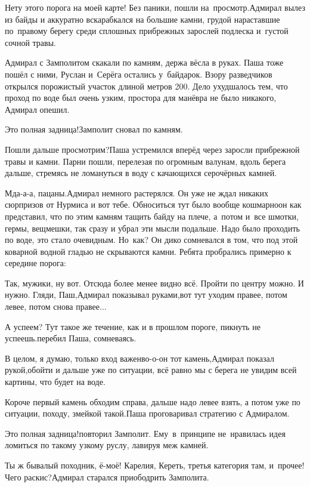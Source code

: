 \diagdash Нету этого порога на моей карте! Без паники, пошли на~просмотр.\mdash Адмирал вылез из байды и аккуратно вскарабкался на большие камни, грудой нараставшие по~правому берегу среди сплошных прибрежных зарослей подлеска и~густой сочной травы.

Адмирал с Замполитом скакали по камням, держа вёсла в руках. Паша тоже пошёл с ними, Руслан и~Серёга остались у~байдарок. Взору разведчиков открылся порожистый участок длиной метров 200. Дело ухудшалось тем, что проход по воде был очень узким, простора для манёвра не было никакого, Адмирал опешил.

\diagdash Это полная задница!\mdash Замполит сновал по камням.

\diagdash Пошли дальше просмотрим?\mdash Паша устремился вперёд через заросли прибрежной травы и камни. Парни пошли, перелезая по огромным валунам, вдоль берега дальше, стремясь не ломануться в воду с качающихся серо\sdash чёрных камней.

\diagdash Мда-а-а, пацаны.\mdash Адмирал немного растерялся. Он уже не ждал никаких сюрпризов от Нурмиса и вот тебе. Обноситься тут было вообще кошмарно\mdash он как представил, что по этим камням тащить байду на плече, а~потом и~все шмотки, гермы, вещмешки, так сразу и убрал эти мысли подальше. Надо было проходить по воде, это стало очевидным. Но~как? Он дико сомневался в том, что под этой коварной водной гладью не скрываются камни. Ребята пробрались примерно к середине порога:

\diagdash Так, мужики, ну вот. Отсюда более менее видно всё. Пройти по центру можно. И нужно. Гляди, Паш,\mdash Адмирал показывал руками,\mdash вот тут уходим правее, потом левее, потом снова правее$\ldots$

\diagdash А успеем? Тут такое же течение, как и в прошлом пороге, пикнуть не успеешь.\mdash перебил Паша, сомневаясь.

\diagdash В целом, я думаю, только вход важен\mdash во-о-он тот камень,\mdash Адмирал показал рукой,\mdash обойти и дальше уже по ситуации, всё равно мы с берега не увидим всей картины, что будет на воде.

\diagdash Короче первый камень обходим справа, дальше надо левее взять, а потом уже по ситуации, походу, змейкой такой.\mdash Паша проговаривал стратегию с Адмиралом. 

\diagdash Это полная задница!\mdash повторил Замполит. Ему~в~принципе не~нравилась идея ломиться по такому узкому руслу, лавируя меж камней.

\diagdash Ты ж бывалый походник, ё-моё! Карелия, Кереть, третья категория там, и~прочее! Чего раскис?\mdash Адмирал старался приободрить Замполита.

